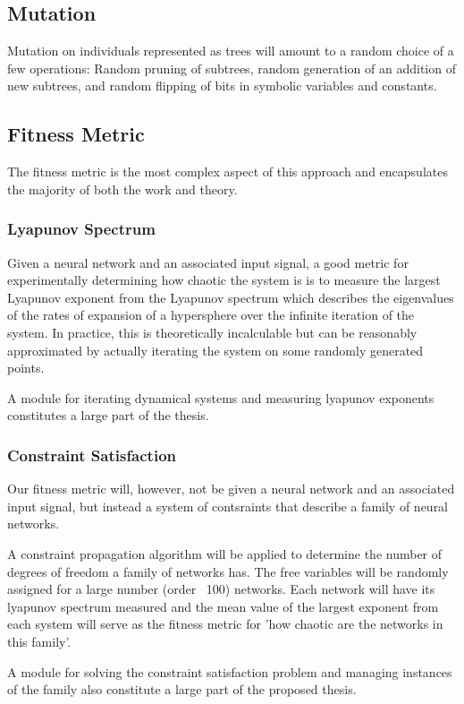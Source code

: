 \documentclass[12pt]{article}
\begin{document}
\subsection{Mutation}
Mutation on individuals represented as trees will amount to a random choice of 
a few operations:  Random pruning of subtrees, random generation of an 
addition of new subtrees, and random flipping of bits in symbolic variables 
and constants.

\subsection{Fitness Metric}
The fitness metric is the most complex aspect of this approach and encapsulates
the majority of both the work and theory.

\subsubsection{Lyapunov Spectrum}
Given a neural network and an associated input signal, a good metric for
experimentally determining how chaotic the system is is to measure the
largest Lyapunov exponent from the Lyapunov spectrum which describes the
eigenvalues of the rates of expansion of a hypersphere over the infinite
iteration of the system.  In practice, this is theoretically incalculable but
can be reasonably approximated by actually iterating the system on 
some randomly generated points.

A module for iterating dynamical systems and measuring lyapunov exponents
constitutes a large part of the thesis.

\subsubsection{Constraint Satisfaction}
Our fitness metric will, however, not be given a neural network and an 
associated input signal, but instead a system of contsraints that describe
a family of neural networks.

A constraint propagation algorithm \cite{norvig}  will be applied to
determine the number of degrees of freedom a family of networks has.
The free variables will be randomly assigned for a large number (order ~100)
networks.  Each network will have its lyapunov spectrum measured and the mean
value of the largest exponent from each system will serve as the fitness metric
for 'how chaotic are the networks in this family'.

A module for solving the constraint satisfaction problem and managing instances
of the family also constitute a large part of the proposed thesis.
\end{document}
